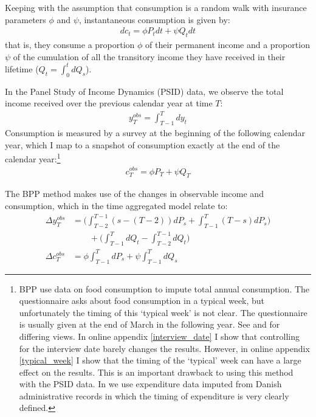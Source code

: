 \documentclass[AER]{AEA}
\begin{document}
Keeping with the assumption that consumption is a random walk with insurance parameters $\phi$ and $\psi$, instantaneous consumption is given by:
\begin{align}
dc_t = \phi P_t  dt +\psi Q_t  dt  \label{consumption_process}
\end{align}
that is, they consume a proportion $\phi$ of their permanent income and a proportion $\psi$ of the cumulation of all the transitory income they have received in their lifetime  ($Q_t =\int_{0}^{t}dQ_s $).

In the Panel Study of Income Dynamics (PSID) data, we observe the total income received over the previous calendar year at time $T$:
\begin{align*}
y^{obs}_T = \int_{T-1}^{T} dy_t
\end{align*}
Consumption is measured by a survey at the beginning of the following calendar year, which I map to a snapshot of consumption exactly at the end of the calendar year:\footnote{BPP use data on food consumption to impute total annual consumption. The questionnaire asks about food consumption in a typical week, but unfortunately the timing of this `typical week' is not clear. The questionnaire is usually given at the end of March in the following year. See \cite{altonji_testing_1987} and \cite{hall_sensitivity_1982} for differing views. In online appendix \ref{interview_date} I show that controlling for the interview date barely changes the results. However, in online appendix \ref{typical_week} I show that the timing of the `typical' week can have a large effect on the results. This is an important drawback to using this method with the PSID data. In \cite{crawley_consumption_2018} we use expenditure data imputed from Danish administrative records in which the timing of expenditure is very clearly defined.}
\begin{align}
c^{obs}_T = \phi P_T  +\psi Q_T \label{c_obs}
\end{align}

The BPP method makes use of the changes in observable income and consumption, which in the time aggregated model relate to:
\begin{align}
\Delta y^{obs}_T &=  \Big(\int_{T-2}^{T-1} (s-(T-2))dP_s  + \int_{T-1}^{T} (T-s)dP_s \Big) \nonumber \\
& \qquad + \Big(\int_{T-1}^{T} dQ_t -\int_{T-2}^{T-1} dQ_t \Big) \label{deltay} \\
\Delta c^{obs}_T &= \phi  \int_{T-1}^{T} dP_s  +\psi \int_{T-1}^{T}dQ_s  \label{deltac}
\end{align}
\end{document}
